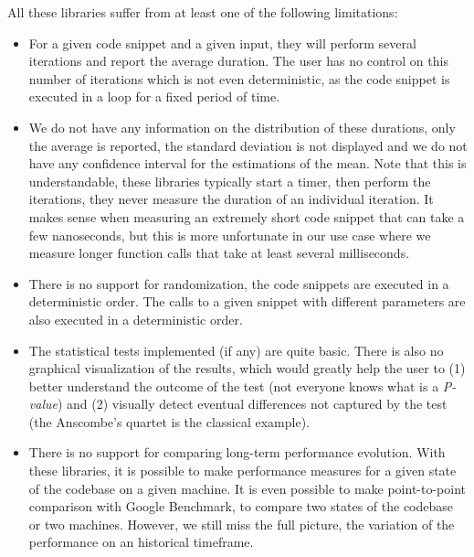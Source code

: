                 All these libraries suffer from at least one of the following limitations:
                \begin{itemize}
                    \item For a given code snippet and a given input, they will perform several iterations and report
                        the average duration. The user has no control on this number of iterations which is not even
                        deterministic, as the code snippet is executed in a loop for a fixed period of time.
                    \item We do not have any information on the distribution of these durations, only the average is
                        reported, the standard deviation is not displayed and we do not have any confidence interval for
                        the estimations of the mean. Note that this is understandable, these libraries typically start a
                        timer, then perform the iterations, they never measure the duration of an individual iteration.
                        It makes sense when measuring an extremely short code snippet that can take a few nanoseconds,
                        but this is more unfortunate in our use case where we measure longer function calls that take at
                        least several milliseconds.
                    \item There is no support for randomization, the code snippets are executed in a deterministic
                        order.  The calls to a given snippet with different parameters are also executed in a
                        deterministic order.
                    \item The statistical tests implemented (if any) are quite basic.  There is also no graphical
                        visualization of the results, which would greatly help the user to (1) better understand the
                        outcome of the test (not everyone knows what is a \emph{P-value}) and (2) visually detect
                        eventual differences not captured by the test (the Anscombe's quartet is the classical example).
                    \item There is no support for comparing long-term performance evolution. With these libraries, it
                        is possible to make performance measures for a given state of the codebase on a given machine.
                        It is even possible to make point-to-point comparison with Google Benchmark, \ie to compare two
                        states of the codebase or two machines. However, we still miss the full picture, the variation
                        of the performance on an historical timeframe.
                \end{itemize}

